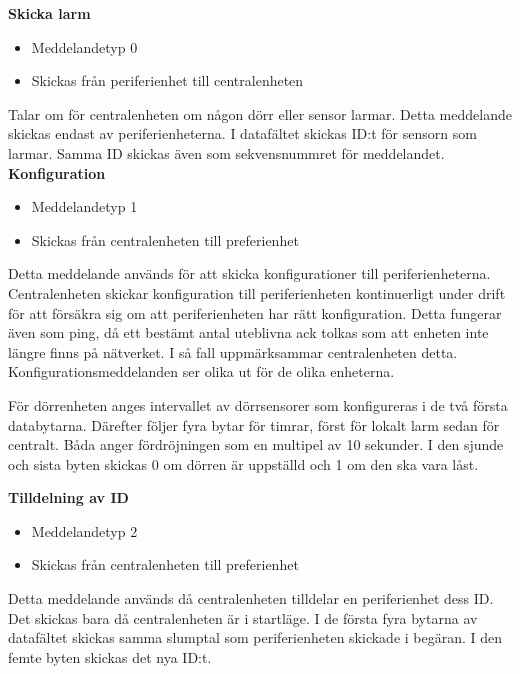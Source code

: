\textbf{Skicka larm}
\begin{itemize}
    \item Meddelandetyp 0
    \item Skickas från periferienhet till centralenheten
\end{itemize}
Talar om för centralenheten om någon dörr eller sensor larmar. Detta meddelande skickas endast av periferienheterna. I datafältet skickas ID:t för sensorn som larmar. Samma ID skickas även som sekvensnummret för meddelandet.\\

 \textbf{Konfiguration}
\begin{itemize}
    \item Meddelandetyp 1
    \item Skickas från centralenheten till preferienhet
\end{itemize}
Detta meddelande används för att skicka konfigurationer till periferienheterna.
Centralenheten skickar konfiguration till periferienheten kontinuerligt under drift för att försäkra sig om att periferienheten har rätt konfiguration. Detta fungerar även som ping, då ett bestämt antal uteblivna ack tolkas som att enheten inte längre finns på nätverket.
I så fall uppmärksammar centralenheten detta. Konfigurationsmeddelanden ser olika ut för de olika enheterna.

För dörrenheten anges intervallet av dörrsensorer som konfigureras i de två första databytarna. Därefter följer fyra bytar för timrar, först för lokalt larm sedan för centralt. Båda anger fördröjningen som en multipel av 10 sekunder. I den sjunde och sista byten skickas 0 om dörren är uppställd och 1 om den ska vara låst.


\textbf{Tilldelning av ID}
\begin{itemize}
    \item Meddelandetyp 2
    \item Skickas från centralenheten till preferienhet
\end{itemize}
Detta meddelande används då centralenheten tilldelar en periferienhet dess ID. Det skickas bara då centralenheten är i startläge. I de första fyra bytarna av datafältet skickas samma slumptal som periferienheten skickade i begäran. I den femte byten skickas det nya ID:t. \\


